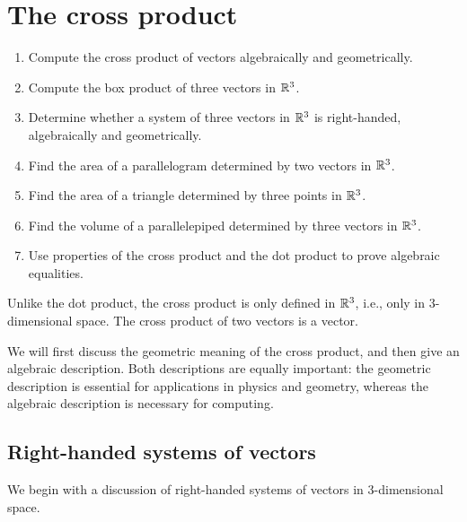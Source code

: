 \section{The cross product}

\begin{outcome}
  \begin{enumerate}
  \item Compute the cross product of vectors algebraically and
    geometrically.
  \item Compute the box product of three vectors in $\mathbb{R}^3$.
  \item Determine whether a system of three vectors in $\mathbb{R}^3$ is
    right-handed, algebraically and geometrically.
  \item Find the area of a parallelogram determined by two vectors in
    $\mathbb{R}^3$.
  \item Find the area of a triangle determined by three points in
    $\mathbb{R}^3$.
  \item Find the volume of a parallelepiped determined by three
    vectors in $\mathbb{R}^3$.
  \item Use properties of the cross product and the dot product to
    prove algebraic equalities.
  \end{enumerate}
\end{outcome}

Unlike the dot product, the cross product is only defined in $\mathbb{R}^3$,
i.e., only in 3-dimensional space. The cross product of two vectors is
a vector.

We will first discuss the geometric meaning of the cross product, and
then give an algebraic description. Both descriptions are equally
important: the geometric description is essential for applications in
physics and geometry, whereas the algebraic description is necessary
for computing.

\subsection{Right-handed systems of vectors}

We begin with a discussion of right-handed systems of vectors in
3-dimensional
space.

